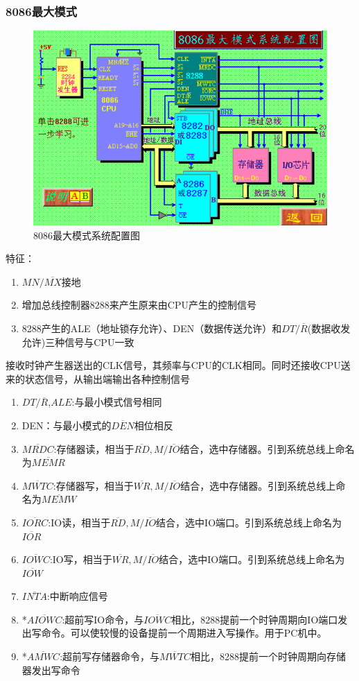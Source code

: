 \subsubsection{8086最大模式}
\begin{figure}[H]
    \centering
    \includegraphics[scale=1]{part_8086CPU/part_8086CPU_pic/8086最大模式系统配置图.png}
    \caption{8086最大模式系统配置图}
\end{figure}
特征：
\begin{enumerate}
    \item $MN/\overline{MX}$接地
    \item 增加总线控制器8288来产生原来由CPU产生的控制信号
    \item 8288产生的ALE（地址锁存允许）、DEN（数据传送允许）和$DT/\overline{R}$(数据收发允许)三种信号与CPU一致
\end{enumerate}
接收时钟产生器送出的CLK信号，其频率与CPU的CLK相同。同时还接收CPU送来的状态信号，从输出端输出各种控制信号
\begin{enumerate}
    \item $DT/\overline{R}$,$ALE$:与最小模式信号相同
    \item DEN：与最小模式的$\overline{DEN}$相位相反
    \item $\overline{MRDC}$:存储器读，相当于$\overline{RD},M/\overline{IO}$结合，选中存储器。引到系统总线上命名为$\overline{MEMR}$
    \item $\overline{MWTC}$:存储器写，相当于$\overline{WR},M/\overline{IO}$结合，选中存储器。引到系统总线上命名为$\overline{MEMW}$
    \item $\overline{IORC}$:IO读，相当于$\overline{RD},M/\overline{IO}$结合，选中IO端口。引到系统总线上命名为$\overline{IOR}$
    \item $\overline{IOWC}$:IO写，相当于$\overline{WR},M/\overline{IO}$结合，选中IO端口。引到系统总线上命名为$\overline{IOW}$
    \item $\overline{INTA}$:中断响应信号
    \item *$\overline{AIOWC}$:超前写IO命令，与$\overline{IOWC}$相比，8288提前一个时钟周期向IO端口发出写命令。可以使较慢的设备提前一个周期进入写操作。用于PC机中。
    \item *$\overline{AMWC}$:超前写存储器命令，与$\overline{MWTC}$相比，8288提前一个时钟周期向存储器发出写命令
\end{enumerate}
